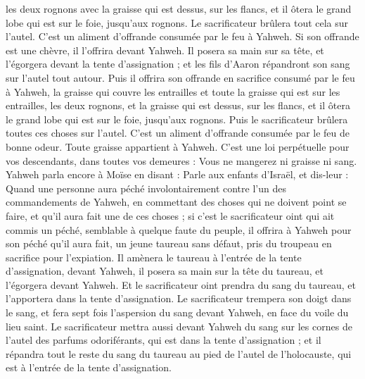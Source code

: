 \begin{multicols}{2}
les deux rognons avec la graisse qui est dessus, sur les flancs, et il ôtera le grand lobe qui est sur le foie, jusqu'aux rognons.
Le sacrificateur brûlera tout cela sur l'autel. C'est un aliment d'offrande consumée par le feu à Yahweh.
Si son offrande est une chèvre, il l'offrira devant Yahweh.
Il posera sa main sur sa tête, et l'égorgera devant la tente d'assignation ; et les fils d'Aaron répandront son sang sur l'autel tout autour.
Puis il offrira son offrande en sacrifice consumé par le feu à Yahweh, la graisse qui couvre les entrailles et toute la graisse qui est sur les entrailles,
les deux rognons, et la graisse qui est dessus, sur les flancs, et il ôtera le grand lobe qui est sur le foie, jusqu'aux rognons.
Puis le sacrificateur brûlera toutes ces choses sur l'autel. C'est un aliment d'offrande consumée par le feu de bonne odeur. Toute graisse appartient à Yahweh.
C'est une loi perpétuelle pour vos descendants, dans toutes vos demeures : Vous ne mangerez ni graisse ni sang.
\VerseOne{}Yahweh parla encore à Moïse en disant :
Parle aux enfants d'Israël, et dis-leur : Quand une personne aura péché involontairement contre l'un des commandements de Yahweh, en commettant des choses qui ne doivent point se faire, et qu'il aura fait une de ces choses ;
 si c'est le sacrificateur oint qui ait commis un péché, semblable à quelque faute du peuple, il offrira à Yahweh pour son péché qu'il aura fait, un jeune taureau sans défaut, pris du troupeau en sacrifice pour l'expiation.
Il amènera le taureau à l'entrée de la tente d'assignation, devant Yahweh, il posera sa main sur la tête du taureau, et l'égorgera devant Yahweh.
Et le sacrificateur oint prendra du sang du taureau, et l'apportera dans la tente d'assignation.
Le sacrificateur trempera son doigt dans le sang, et fera sept fois l'aspersion du sang devant Yahweh, en face du voile du lieu saint.
Le sacrificateur mettra aussi devant Yahweh du sang sur les cornes de l'autel des parfums odoriférants, qui est dans la tente d'assignation ; et il répandra tout le reste du sang du taureau au pied de l'autel de l'holocauste, qui est à l'entrée de la tente d'assignation.

\end{multicols}
